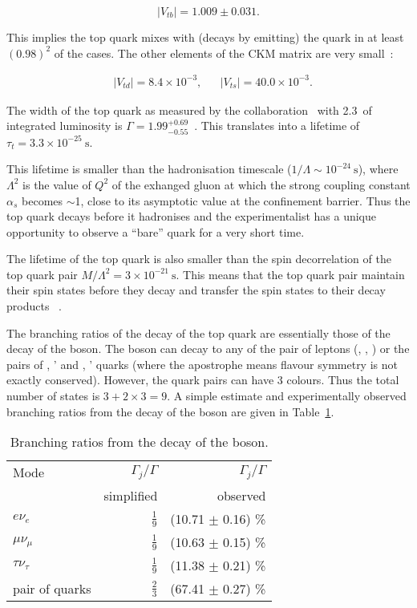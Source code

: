 \begin{equation}
  |V_{tb}|=1.009\pm0.031.
\end{equation}

This implies the top quark mixes with (decays by emitting) the \cPqb quark in at least $(0.98)^{2}$ of the cases. The other elements of the CKM matrix are very small~\cite{Patrignani:2016xqp}:

\begin{align}
  & |V_{td}|=8.4\times10^{-3}, && |V_{ts}|=40.0\times10^{-3}.
\end{align}

The width of the top quark as measured by the \DZERO collaboration~\cite{Abazov:2010tm} with 2.3~\fbinv of integrated luminosity is $\Gamma=1.99^{+0.69}_{-0.55}$~\GeV. This translates into a lifetime of $\tau_{t}=3.3\times10^{-25}~\text{s}$.

This lifetime is smaller than the hadronisation timescale ($1/\Lambda\sim10^{-24}~\text{s}$), where $\Lambda^{2}$ is the value of $Q^{2}$ of the exhanged gluon at which the strong coupling constant $\alpha_{s}$ becomes $\sim$1, close to its asymptotic value at the confinement barrier. Thus the top quark decays before it hadronises and the experimentalist has a unique opportunity to observe a ``bare'' quark for a very short time.

The lifetime of the top quark is also smaller than the spin decorrelation of the top quark pair $M/{\Lambda^{2}}=3\times10^{-21}~\text{s}$. This means that the top quark pair maintain their spin states before they decay and transfer the spin states to their decay products ~\cite{Cristinziani:2016vif}.

The branching ratios of the decay of the top quark are essentially those of the decay of the \PW boson. The \PW boson can decay to any of the pair of leptons (\Pe\Pgne, \Pgm\Pgngm, \Pgt\Pgngt) or the pairs of \cPqu, \cPqd' and \cPqc, \cPqs' quarks (where the apostrophe means flavour symmetry is not exactly conserved). However, the quark pairs can have 3 colours. Thus the total number of states is $3+2\times3=9$. A simple estimate and experimentally observed branching ratios from the decay of the \PW boson are given in Table~\ref{tab:W_br}.

\begin{table}[h!]
  \centering
  \caption{Branching ratios from the decay of the \PW boson.}
  \label{tab:W_br}
  \begin{tabular}{l r r}
    Mode                  & $\Gamma_{j}/\Gamma$ & $\Gamma_{j}/\Gamma$\\
                          & simplified          & observed \cite{Patrignani:2016xqp}\\
    \hline
    $e\nu_{e}$            & $\frac{1}{9}$       & (10.71 $\pm$ 0.16) \%\\
    $\mu\nu_{\mu}$        & $\frac{1}{9}$       & (10.63 $\pm$ 0.15) \%\\
    $\tau\nu_{\tau}$      & $\frac{1}{9}$       & (11.38 $\pm$ 0.21) \%\\
    pair of quarks        & $\frac{2}{3}$       & (67.41 $\pm$ 0.27) \%
  \end{tabular}
\end{table}


